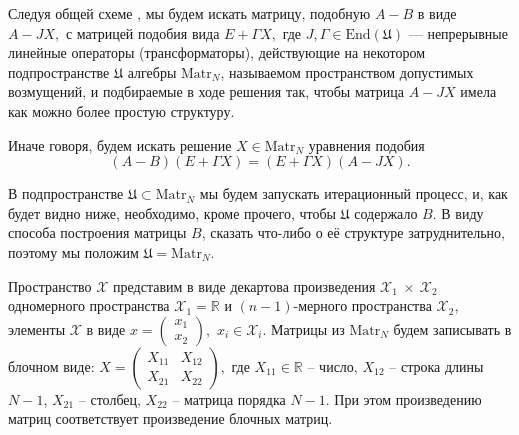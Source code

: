 Следуя общей схеме \cite{baskakov-harmonic}, мы будем искать матрицу, подобную \( A - B \)
в виде
\( A - J X, \)
с матрицей подобия вида
\( E + \Gamma X ,\)
где
\( J, \Gamma \in \mathrm{End}\left(\mathfrak U\right) \)
--- непрерывные линейные операторы (трансформаторы),
действующие на некотором подпространстве \( \mathfrak U \)
алгебры \( \mathrm{Matr}_{N} \),
называемом пространством допустимых возмущений,
и подбираемые в ходе решения так, чтобы матрица \( A - JX \)
имела как можно более простую структуру.

Иначе говоря, будем искать решение \( X \in\mathrm{Matr}_{N} \)
уравнения подобия
\begin{equation}\label{eq:similarity-orig}
    (A - B)(E+\Gamma X) = (E+\Gamma X) (A - JX).
\end{equation}

В подпространстве \( \mathfrak U \subset \mathrm{Matr}_{N} \)
мы будем запускать итерационный процесс,
и, как будет видно ниже, необходимо, кроме прочего,
чтобы \( \mathfrak U \) содержало \( B \).
В виду способа построения матрицы \( B \), сказать что-либо о её структуре затруднительно,
поэтому мы положим \( \mathfrak U = \mathrm{Matr}_{N}\).

Пространство \( \mathscr{X} \) представим в виде
декартова произведения
\( \mathscr{X}_1~\times~\mathscr{X}_2 \)
одномерного пространства \( \mathscr{X}_1=\mathbb{R} \)
и \((n-1)\)-мерного пространства \( \mathscr{X}_2 \),
элементы \( \mathscr{X} \) в виде
\( x=\begin{pmatrix}x_1\\x_2\end{pmatrix}, \)
\( x_i\in\mathscr{X}_i \).
Матрицы из \( \mathrm{Matr}_{N} \) будем записывать
в блочном виде:
\(
    X = \begin{pmatrix}
    X_{11} & X_{12} \\
    X_{21} & X_{22}
    \end{pmatrix},
    \)
где \( { X_{11}\in\mathbb{R} } \) -- число,
    \( X_{12} \) -- строка длины \( N-1 \),
    \( X_{21} \) -- столбец,
    \( X_{22} \) -- матрица порядка \( N-1 \).
При этом произведению матриц соответствует произведение блочных матриц.

